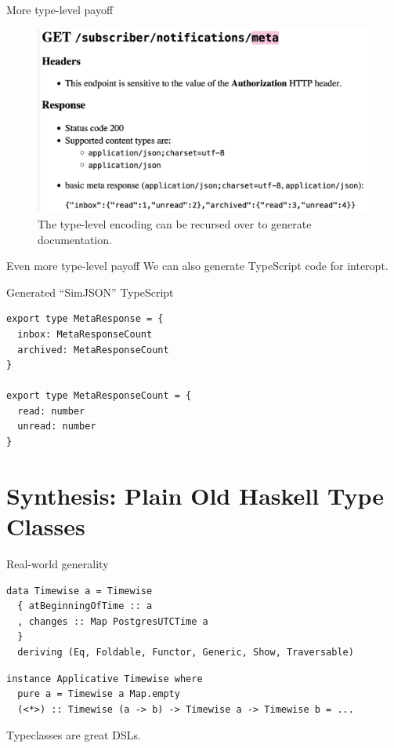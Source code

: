 \documentclass[aspectratio=169,ignorenonframetext]{beamer}
\begin{document}
\begin{frame}{More type-level payoff}
	\begin{figure}
		\includegraphics[height=.6\textheight]{images/servant.docs.png}
		\caption{
			The type-level encoding can be recursed over to generate
			documentation.
		}
	\end{figure}
\end{frame}

\begin{frame}[fragile]{Even more type-level payoff}
	We can also generate TypeScript code for interopt.
	\begin{block}{Generated ``SimJSON'' TypeScript}
		\begin{verbatim}
export type MetaResponse = {
  inbox: MetaResponseCount
  archived: MetaResponseCount
}

export type MetaResponseCount = {
  read: number
  unread: number
}
        \end{verbatim}
	\end{block}
\end{frame}

\section{Synthesis: Plain Old Haskell Type Classes}

\begin{frame}[fragile]{Real-world generality}
	\begin{block}{}
		\begin{verbatim}
data Timewise a = Timewise
  { atBeginningOfTime :: a
  , changes :: Map PostgresUTCTime a
  }
  deriving (Eq, Foldable, Functor, Generic, Show, Traversable)
        \end{verbatim}
	\end{block}
	\begin{block}{}
		\begin{verbatim}
instance Applicative Timewise where
  pure a = Timewise a Map.empty
  (<*>) :: Timewise (a -> b) -> Timewise a -> Timewise b = ...
        \end{verbatim}
	\end{block}
	\begin{exampleblock}{}
		Typeclasses are great DSLs.
	\end{exampleblock}
\end{frame}
\end{document}
